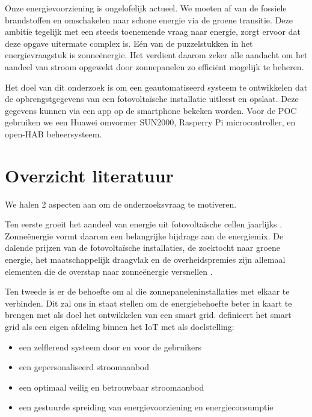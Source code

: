 \documentclass{hogent-article}
\begin{document}
    Onze energievoorziening is ongelofelijk actueel. We moeten af van de fossiele brandstoffen en omschakelen naar schone energie via de groene transitie. Deze ambitie tegelijk met een steeds toenemende vraag naar energie, zorgt ervoor dat deze opgave uitermate complex is. Eén van de puzzelstukken in het energievraagstuk is zonneënergie. Het verdient daarom zeker alle aandacht om het aandeel van stroom opgewekt door zonnepanelen zo efficiënt mogelijk te beheren.
    
    Het doel van dit onderzoek is om een geautomatiseerd systeem te ontwikkelen dat de opbrengstgegevens van een fotovoltaïsche installatie uitleest en opslaat. Deze gegevens kunnen via een app op de smartphone bekeken worden. Voor de POC gebruiken we een Huawei omvormer SUN2000, Rasperry Pi microcontroller, en open-HAB beheersysteem.
    
    \section{Overzicht literatuur}
    
    
    We halen 2 aspecten aan om de onderzoeksvraag te motiveren.
    
    Ten eerste groeit het aandeel van energie uit fotovoltaïsche cellen jaarlijks \autocite{Shurtleff2014}. Zonneënergie vormt daarom een belangrijke bijdrage aan de energiemix. De dalende prijzen van de fotovoltaïsche installaties, de zoektocht naar groene energie, het maatschappelijk draagvlak en de overheidspremies zijn allemaal elementen die de overstap naar zonneënergie versnellen \autocite{Kouro2015}.
    
    Ten tweede is er de behoefte om al die zonnepaneleninstallaties met elkaar te verbinden. Dit zal ons in staat stellen om de energiebehoefte beter in kaart te brengen met als doel het ontwikkelen van een smart grid. \textcite{Vijayapriya2011} definieert het smart grid als een eigen afdeling binnen het IoT met als doelstelling:
    \begin{itemize}
        \item een zelflerend systeem door en voor de gebruikers
        \item een gepersonaliseerd stroomaanbod
        \item een optimaal veilig en betrouwbaar stroomaanbod
        \item een gestuurde spreiding van energievoorziening en energieconsumptie
    \end{itemize}
\end{document}

